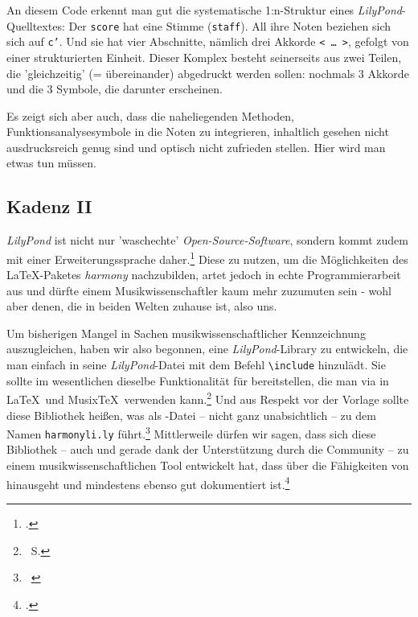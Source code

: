 An diesem Code erkennt man gut die systematische 1:n-Struktur eines
\textit{LilyPond}-Quelltextes: Der \texttt{score} hat eine Stimme
(\texttt{staff}). All ihre Noten beziehen sich sich auf \texttt{c'}. Und sie hat
vier Abschnitte, nämlich drei Akkorde \texttt{< \ldots\ >}, gefolgt von einer
strukturierten Einheit. Dieser Komplex besteht seinerseits aus zwei Teilen, die
'gleichzeitig' (= übereinander) abgedruckt werden sollen: nochmals 3 Akkorde und
die 3 Symbole, die darunter erscheinen.

Es zeigt sich aber auch, dass die naheliegenden Methoden,
Funktionsanalysesymbole in die Noten zu integrieren, inhaltlich gesehen nicht
ausdrucksreich genug sind und optisch nicht zufrieden stellen. Hier wird man
etwas tun müssen. 

\subsection{Kadenz II}

\textit{LilyPond} ist nicht nur 'waschechte' \textit{Open-Source-Software},
sondern kommt zudem mit einer Erweiterungssprache daher.\footcite[vgl.
dazu][\nopage wp.]{WpedGuile2019a} Diese zu nutzen, um die Möglichkeiten des
\LaTeX-Paketes \textit{harmony} nachzubilden, artet jedoch in echte
Programmierarbeit aus und dürfte einem Musikwissenschaftler kaum mehr zuzumuten
sein - wohl aber denen, die in beiden Welten zuhause ist, also uns.

\label{LilyPondFuncTheory}Um  bisherigen Mangel in Sachen
musikwissenschaftlicher Kennzeichnung auszugleichen, haben wir also begonnen,
eine \textit{LilyPond}-Library zu entwickeln, die man einfach in seine
\textit{LilyPond}-Datei mit dem Befehl \texttt{\textbackslash{include}}
hinzulädt. Sie sollte im wesentlichen dieselbe Funktionalität für 
bereitstellen, die man via  in \LaTeX\ und Musix\TeX\ verwenden
kann.\footnote{\ra\ S.\pageref{Harmony}} Und aus Respekt vor der Vorlage sollte
diese Bibliothek  heißen, was als -Datei -- nicht
ganz unabsichtlich -- zu dem Namen \texttt{harmonyli.ly} führt.\footnote{\ra\
} Mittlerweile dürfen wir sagen,
dass sich diese Bibliothek -- auch und gerade dank der Unterstützung durch die
Community -- zu einem musikwissenschaftlichen Tool entwickelt hat, dass über die
Fähigkeiten von \acc{Harmony} hinausgeht und mindestens ebenso gut dokumentiert
ist.\footcite[vgl.][1ff]{Reincke2019b}

